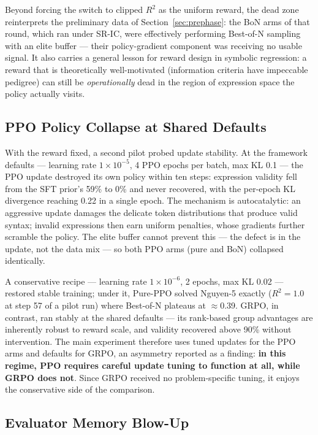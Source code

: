 Beyond forcing the switch to clipped $R^2$ as the uniform reward, the dead zone reinterprets the preliminary data of Section~\ref{sec:prephase}: the BoN arms of that round, which ran under SR-IC, were effectively performing Best-of-N sampling with an elite buffer --- their policy-gradient component was receiving no usable signal. It also carries a general lesson for reward design in symbolic regression: a reward that is theoretically well-motivated (information criteria have impeccable pedigree) can still be \emph{operationally} dead in the region of expression space the policy actually visits.

\subsection{PPO Policy Collapse at Shared Defaults}
\label{sec:ppo_collapse}

With the reward fixed, a second pilot probed update stability. At the framework defaults --- learning rate $1\times10^{-5}$, 4 PPO epochs per batch, max KL 0.1 --- the PPO update destroyed its own policy within ten steps: expression validity fell from the SFT prior's 59\% to 0\% and never recovered, with the per-epoch KL divergence reaching 0.22 in a single epoch. The mechanism is autocatalytic: an aggressive update damages the delicate token distributions that produce valid syntax; invalid expressions then earn uniform penalties, whose gradients further scramble the policy. The elite buffer cannot prevent this --- the defect is in the update, not the data mix --- so both PPO arms (pure and BoN) collapsed identically.

A conservative recipe --- learning rate $1\times10^{-6}$, 2 epochs, max KL 0.02 --- restored stable training; under it, Pure-PPO solved Nguyen-5 exactly ($R^2 = 1.0$ at step 57 of a pilot run) where Best-of-N plateaus at $\approx$0.39. GRPO, in contrast, ran stably at the shared defaults --- its rank-based group advantages are inherently robust to reward scale, and validity recovered above 90\% without intervention. The main experiment therefore uses tuned updates for the PPO arms and defaults for GRPO, an asymmetry reported as a finding: \textbf{in this regime, PPO requires careful update tuning to function at all, while GRPO does not}. Since GRPO received no problem-specific tuning, it enjoys the conservative side of the comparison.

\subsection{Evaluator Memory Blow-Up}

